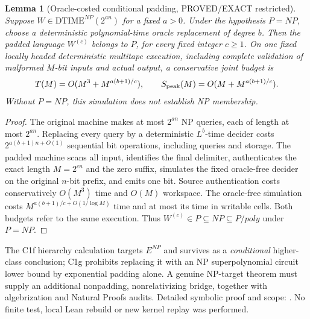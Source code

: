 \documentclass[11pt]{article}
\newtheorem{lemma}{Lemma}
\begin{document}
\begin{lemma}[Oracle-costed conditional padding, PROVED/EXACT restricted]
Suppose $W\in\mathrm{DTIME}^{NP}(2^{an})$ for a fixed $a>0$.
Under the hypothesis $P=NP$, choose a deterministic polynomial-time
oracle replacement of degree $b$. Then the padded language
$W^{(c)}$ belongs to $P$, for every fixed integer $c\ge1$.
On one fixed locally headed deterministic multitape execution, including
complete validation of malformed $M$-bit inputs and actual output, a
conservative joint budget is
\[
T(M)=O(M^3+M^{a(b+1)/c}),\qquad
S_{\rm peak}(M)=O(M+M^{a(b+1)/c}).
\]
Without $P=NP$, this simulation does not establish NP membership.
\end{lemma}
\begin{proof}
The original machine makes at most $2^{an}$ NP queries,
each of length at most $2^{an}$. Replacing every query
by a deterministic $L^b$-time decider costs
$2^{a(b+1)n+O(1)}$ sequential bit operations, including
queries and storage. The padded machine scans all input,
identifies the final delimiter, authenticates the exact
length $M=2^{cn}$ and the zero suffix, simulates the fixed
oracle-free decider on the original $n$-bit prefix, and emits
one bit. Source authentication costs conservatively $O(M^3)$
time and $O(M)$ workspace. The oracle-free simulation costs
$M^{a(b+1)/c+O(1/\log M)}$ time and at most its time in
writable cells. Both budgets refer to the same execution.
Thus $W^{(c)}\in P\subseteq NP\subseteq P/poly$ under $P=NP$.
\end{proof}
The C1f hierarchy calculation targets $E^{NP}$ and survives as
a \emph{conditional} higher-class conclusion; C1g prohibits replacing
it with an NP superpolynomial circuit lower bound by exponential
padding alone. A genuine NP-target theorem must supply an additional
nonpadding, nonrelativizing bridge, together with algebrization and
Natural Proofs audits. Detailed symbolic proof and scope:
.
No finite test, local Lean rebuild or new kernel replay was performed.
\end{document}
